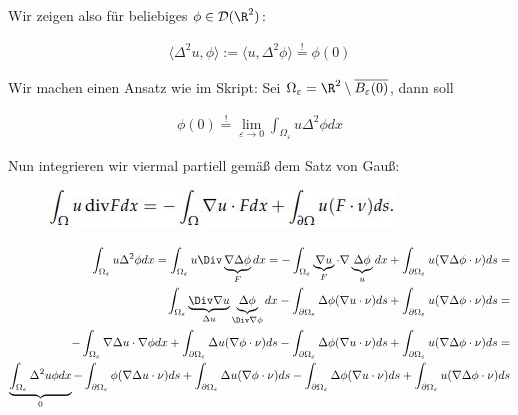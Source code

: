 \begin{solution}

Wir zeigen also für beliebiges $\phi \in \mathcal{D}(\R^2)$:

\begin{align*}
  \langle \Delta^2u, \phi \rangle
  :=
  \langle u, \Delta^2 \phi \rangle
  \stackrel{!}{=}
  \phi(0)
\end{align*}

Wir machen einen Ansatz wie im Skript: Sei $\Omega_\varepsilon = \R^2 \setminus \overline{B_\varepsilon(0)}$, dann soll

\begin{align*}
  \phi(0)
  \stackrel{!}{=}
  \lim_{\varepsilon \rightarrow 0}\int_{\Omega_\varepsilon} u \Delta^2 \phi dx
\end{align*}

Nun integrieren wir viermal partiell gemäß dem Satz von Gauß:

\begin{figure}[h!]
  \centering
  \includegraphics[width = 0.75 \textwidth]{Gauß-PI.jpg}
\end{figure}

\begin{align*}
  \int_{\Omega_\varepsilon} u \Delta^2 \phi dx
  =
  \int_{\Omega_\varepsilon} u \Div\underbrace{\nabla \Delta \phi}_F dx
  =
  -\int_{\Omega_\varepsilon} \underbrace{\nabla u}_{F} \cdot \nabla \underbrace{\Delta \phi}_{u} dx
  +
  \int_{\partial \Omega_\varepsilon} u(\nabla \Delta \phi \cdot \nu) ds
  = \\
  \int_{\Omega_\varepsilon} \underbrace{\Div\nabla u}_{\Delta u} \underbrace{\Delta \phi}_{\Div \nabla \phi} dx
  -
  \int_{\partial \Omega_\varepsilon} \Delta \phi (\nabla u \cdot \nu) ds
  +
  \int_{\partial \Omega_\varepsilon} u(\nabla \Delta \phi \cdot \nu) ds
  = \\
  -\int_{\Omega_\varepsilon} \nabla \Delta u \cdot \nabla \phi dx
  +
  \int_{\partial \Omega_\varepsilon} \Delta u (\nabla \phi \cdot \nu) ds
  -
  \int_{\partial \Omega_\varepsilon} \Delta \phi (\nabla u \cdot \nu) ds
  +
  \int_{\partial \Omega_\varepsilon} u(\nabla \Delta \phi \cdot \nu) ds
  = \\
  \underbrace{\int_{\Omega_\varepsilon} \Delta^2 u \phi dx}_{0}
  -
  \int_{\partial \Omega_\varepsilon} \phi (\nabla \Delta u \cdot \nu) ds
  +
  \int_{\partial \Omega_\varepsilon} \Delta u (\nabla \phi \cdot \nu) ds
  -
  \int_{\partial \Omega_\varepsilon} \Delta \phi (\nabla u \cdot \nu) ds
  +
  \int_{\partial \Omega_\varepsilon} u(\nabla \Delta \phi \cdot \nu) ds
\end{align*}


\end{solution}
